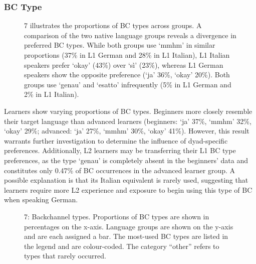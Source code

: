 \subsubsection{  BC Type}
\hypertarget{Toc191305954}{}\begin{figure}
\caption{7 illustrates the proportions of BC types across groups. A comparison of the two native language groups reveals a divergence in preferred BC types. While both groups use ‘mmhm’ in similar proportions (37\% in L1 German and 28\% in L1 Italian), L1 Italian speakers prefer ‘okay’ (43\%) over ‘sì’ (23\%), whereas L1 German speakers show the opposite preference (‘ja’ 36\%, ‘okay’ 20\%). Both groups use ‘genau’ and ‘esatto’ infrequently (5\% in L1 German and 2\% in L1 Italian).}
\label{fig:key:4}
\end{figure}

Learners show varying proportions of BC types. Beginners more closely resemble their target language than advanced learners (beginners: ‘ja’ 37\%, ‘mmhm’ 32\%, ‘okay’ 29\%; advanced: ‘ja’ 27\%, ‘mmhm’ 30\%, ‘okay’ 41\%). However, this result warrants further investigation to determine the influence of dyad-specific preferences. Additionally, L2 learners may be transferring their L1 BC type preferences, as the type ‘genau’ is completely absent in the beginners' data and constitutes only 0.47\% of BC occurrences in the advanced learner group. A possible explanation is that its Italian equivalent is rarely used, suggesting that learners require more L2 experience and exposure to begin using this type of BC when speaking German.

  
 

\begin{stylecaption}\begin{figure}
\caption{7: Backchannel types. Proportions of BC types are shown in percentages on the x-axis. Language groups are shown on the y-axis and are each assigned a bar. The most-used BC types are listed in the legend and are colour-coded. The category “other” refers to types that rarely occurred.}
\label{fig:key:4}
\end{figure}\end{stylecaption}

